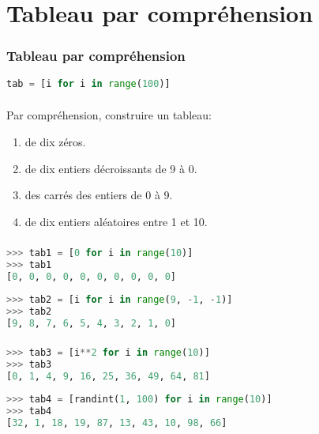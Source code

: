 \documentclass[svgnames,11pt]{beamer}
\begin{document}
\section{Tableau par compréhension}
\begin{frame}[fragile]
    \frametitle{Tableau par compréhension}

\begin{center}
\begin{lstlisting}[language=Python , basicstyle=\ttfamily\small, xleftmargin=2em, xrightmargin=2em]
tab = [i for i in range(100)]
\end{lstlisting}
\label{CODE}
\end{center}

\end{frame}
\begin{frame}
    \frametitle{}

    \begin{activite}
        Par compréhension, construire un tableau:
    \begin{enumerate}
        \item de dix zéros.
        \item de dix entiers décroissants de 9 à 0.
        \item des carrés des entiers de 0 à 9.
        \item de dix entiers aléatoires entre 1 et 10.
    \end{enumerate}
    \end{activite}

\end{frame}
\begin{frame}[fragile]
    \frametitle{}

    
\begin{lstlisting}[language=Python , basicstyle=\ttfamily\small, xleftmargin=2em, xrightmargin=2em]
>>> tab1 = [0 for i in range(10)]
>>> tab1
[0, 0, 0, 0, 0, 0, 0, 0, 0, 0]
\end{lstlisting}

\begin{lstlisting}[language=Python , basicstyle=\ttfamily\small, xleftmargin=2em, xrightmargin=2em]
>>> tab2 = [i for i in range(9, -1, -1)]
>>> tab2
[9, 8, 7, 6, 5, 4, 3, 2, 1, 0]
\end{lstlisting}
\end{frame}
\begin{frame}[fragile]
    \frametitle{}

    
\begin{lstlisting}[language=Python , basicstyle=\ttfamily\small, xleftmargin=2em, xrightmargin=0em]
>>> tab3 = [i**2 for i in range(10)]
>>> tab3
[0, 1, 4, 9, 16, 25, 36, 49, 64, 81]
\end{lstlisting}

\begin{lstlisting}[language=Python , basicstyle=\ttfamily\small, xleftmargin=2em, xrightmargin=0em]
>>> tab4 = [randint(1, 100) for i in range(10)]
>>> tab4
[32, 1, 18, 19, 87, 13, 43, 10, 98, 66]
\end{lstlisting}
\end{frame}
\end{document}
